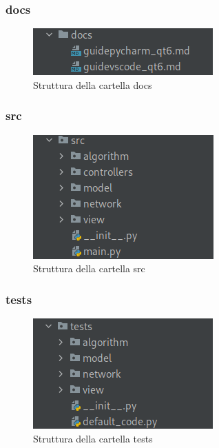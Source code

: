 \subsubsection{docs}    
\begin{figure}[H]
    \centering
    \includegraphics[scale = 0.5]{components/img/struttura-cartella-docs.png}
    \caption{Struttura della cartella docs}
    \label{fig:Struttura della cartella docs}
\end{figure}    
\subsubsection{src} \label{sec:cartelle-src}
\begin{figure}[H]
    \centering
    \includegraphics[scale = 0.5]{components/img/struttura-cartella-src.png}
    \caption{Struttura della cartella src}
    \label{fig:Struttura della cartella src}
\end{figure}    
\subsubsection{tests}    
\begin{figure}[H]
    \centering
    \includegraphics[scale = 0.5]{components/img/struttura-cartella-tests.png}
    \caption{Struttura della cartella tests}
    \label{fig:Struttura della cartella tests}
\end{figure}